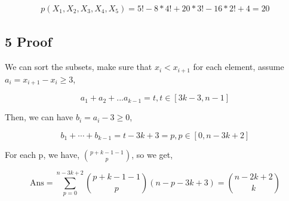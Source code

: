 \documentclass{article}
\begin{document}
\[ 
\begin{split}
p(X_1, X_2, X_3, X_4, X_5) = 5! - 8 * 4! + 20 * 3! - 16 * 2! + 4 = 20
\end{split}
\]



\subsection*{5 Proof}

We can sort the subsets, make sure that $x_i < x_{i+1}$ for each element, assume $a_i = x_{i+1} - x_i \ge 3$,

$$a_1 + a_2 + ... a_{k-1} = t, t \in [3k-3, n - 1]$$

Then, we can have $b_i = a_i - 3 \ge 0$,

$$b_1 + \cdots + b_{k-1} = t - 3k + 3 = p, p \in [0, n - 3k + 2]$$

For each p, we have, ${p + k - 1 - 1 \choose p}$, so we get,

$$\text{Ans} = \sum \limits_{p=0}^{n-3k+2}{p + k - 1 - 1 \choose p} \left( n - p - 3k + 3\right) = {n - 2k + 2 \choose k}$$
\end{document}
